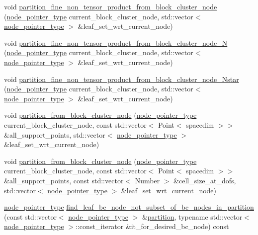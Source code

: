 \begin{DoxyCompactItemize}
\item 
void \hyperlink{classBlockClusterTree_aa6354696477c8cae61d362b5ec707034}{partition\+\_\+fine\+\_\+non\+\_\+tensor\+\_\+product\+\_\+from\+\_\+block\+\_\+cluster\+\_\+node} (\hyperlink{classTreeNode}{node\+\_\+pointer\+\_\+type} current\+\_\+block\+\_\+cluster\+\_\+node, std\+::vector$<$ \hyperlink{classTreeNode}{node\+\_\+pointer\+\_\+type} $>$ \&leaf\+\_\+set\+\_\+wrt\+\_\+current\+\_\+node)
\item 
void \hyperlink{classBlockClusterTree_aafad0fae48bf7c462e8e943b76893fc0}{partition\+\_\+fine\+\_\+non\+\_\+tensor\+\_\+product\+\_\+from\+\_\+block\+\_\+cluster\+\_\+node\+\_\+N} (\hyperlink{classTreeNode}{node\+\_\+pointer\+\_\+type} current\+\_\+block\+\_\+cluster\+\_\+node, std\+::vector$<$ \hyperlink{classTreeNode}{node\+\_\+pointer\+\_\+type} $>$ \&leaf\+\_\+set\+\_\+wrt\+\_\+current\+\_\+node)
\item 
void \hyperlink{classBlockClusterTree_afdeb6723e01b5eaf11281e2c1c1cf566}{partition\+\_\+fine\+\_\+non\+\_\+tensor\+\_\+product\+\_\+from\+\_\+block\+\_\+cluster\+\_\+node\+\_\+\+Nstar} (\hyperlink{classTreeNode}{node\+\_\+pointer\+\_\+type} current\+\_\+block\+\_\+cluster\+\_\+node, std\+::vector$<$ \hyperlink{classTreeNode}{node\+\_\+pointer\+\_\+type} $>$ \&leaf\+\_\+set\+\_\+wrt\+\_\+current\+\_\+node)
\item 
void \hyperlink{classBlockClusterTree_ad11fb277e43c33f2a399dc6b1c14b998}{partition\+\_\+from\+\_\+block\+\_\+cluster\+\_\+node} (\hyperlink{classTreeNode}{node\+\_\+pointer\+\_\+type} current\+\_\+block\+\_\+cluster\+\_\+node, const std\+::vector$<$ Point$<$ spacedim $>$$>$ \&all\+\_\+support\+\_\+points, std\+::vector$<$ \hyperlink{classTreeNode}{node\+\_\+pointer\+\_\+type} $>$ \&leaf\+\_\+set\+\_\+wrt\+\_\+current\+\_\+node)
\item 
void \hyperlink{classBlockClusterTree_a425583a70d63ddbf9341a31b736bd0fe}{partition\+\_\+from\+\_\+block\+\_\+cluster\+\_\+node} (\hyperlink{classTreeNode}{node\+\_\+pointer\+\_\+type} current\+\_\+block\+\_\+cluster\+\_\+node, const std\+::vector$<$ Point$<$ spacedim $>$$>$ \&all\+\_\+support\+\_\+points, const std\+::vector$<$ Number $>$ \&cell\+\_\+size\+\_\+at\+\_\+dofs, std\+::vector$<$ \hyperlink{classTreeNode}{node\+\_\+pointer\+\_\+type} $>$ \&leaf\+\_\+set\+\_\+wrt\+\_\+current\+\_\+node)
\item 
\hyperlink{classTreeNode}{node\+\_\+pointer\+\_\+type} \hyperlink{classBlockClusterTree_a97a99684ebd9ed470a79e56b73374068}{find\+\_\+leaf\+\_\+bc\+\_\+node\+\_\+not\+\_\+subset\+\_\+of\+\_\+bc\+\_\+nodes\+\_\+in\+\_\+partition} (const std\+::vector$<$ \hyperlink{classTreeNode}{node\+\_\+pointer\+\_\+type} $>$ \&\hyperlink{classBlockClusterTree_a3ca42421f732c20fc07bdf5d5ab94319}{partition}, typename std\+::vector$<$ \hyperlink{classTreeNode}{node\+\_\+pointer\+\_\+type} $>$\+::const\+\_\+iterator \&it\+\_\+for\+\_\+desired\+\_\+bc\+\_\+node) const

\end{DoxyCompactItemize}
